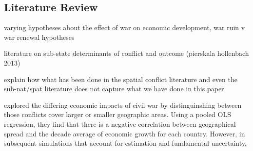 \subsection{Literature Review}
\label{lit}

varying hypotheses about the effect of war on economic development, war ruin v war renewal hypotheses

literature on sub-state determinants of conflict and outcome (pierskala hollenbach 2013)

	explain how what has been done in the spatial conflict literature and even the sub-nat/spat literature does not capture what we have done in this paper



\cite{imai:weinstein:2000} explored the differing economic impacts of civil war by distinguinshing between those conflicts cover larger or smaller geographic areas.  Using a pooled OLS regression, they find that there is a negative correlation between geographical spread and the decade average of economic growth for each country.  However, in subsequent simulations that account for estimation and fundamental uncertainty, 